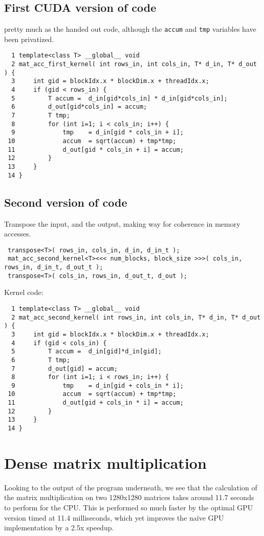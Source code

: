 \documentclass[a4paper,10pt]{article}
\begin{document}
\subsection{First CUDA version of code}
pretty much as the handed out code, although the \texttt{accum} and \texttt{tmp} variables have been privatized.
\begin{verbatim}
  1 template<class T> __global__ void
  2 mat_acc_first_kernel( int rows_in, int cols_in, T* d_in, T* d_out ) {
  3     int gid = blockIdx.x * blockDim.x + threadIdx.x;
  4     if (gid < rows_in) {
  5         T accum =  d_in[gid*cols_in] * d_in[gid*cols_in];
  6         d_out[gid*cols_in] = accum;
  7         T tmp;
  8         for (int i=1; i < cols_in; i++) {
  9             tmp    = d_in[gid * cols_in + i];
 10             accum  = sqrt(accum) + tmp*tmp;
 11             d_out[gid * cols_in + i] = accum;
 12         }
 13     }
 14 }
\end{verbatim}

\vfill

\subsection{Second version of code}


Transpose the input, and the output, making way for coherence in memory accesses.
\begin{verbatim}
 transpose<T>( rows_in, cols_in, d_in, d_in_t );
 mat_acc_second_kernel<T><<< num_blocks, block_size >>>( cols_in, rows_in, d_in_t, d_out_t );
 transpose<T>( cols_in, rows_in, d_out_t, d_out );
\end{verbatim}

Kernel code:
\begin{verbatim}
  1 template<class T> __global__ void
  2 mat_acc_second_kernel( int rows_in, int cols_in, T* d_in, T* d_out ) {
  3     int gid = blockIdx.x * blockDim.x + threadIdx.x;
  4     if (gid < cols_in) {
  5         T accum =  d_in[gid]*d_in[gid];
  6         T tmp;
  7         d_out[gid] = accum;
  8         for (int i=1; i < rows_in; i++) {
  9             tmp    = d_in[gid + cols_in * i];
 10             accum  = sqrt(accum) + tmp*tmp;
 11             d_out[gid + cols_in * i] = accum;
 12         }
 13     }
 14 }
\end{verbatim}

\vfill

\newpage
\section{Dense matrix multiplication}
Looking to the output of the program underneath, we see that the calculation of the matrix multiplication on two 1280x1280 matrices takes around 11.7 seconds to perform for the CPU.
This is performed so much faster by the optimal GPU version timed at 11.4 milliseconds, which yet improves the naïve GPU implementation by a 2.5x speedup.
\end{document}
